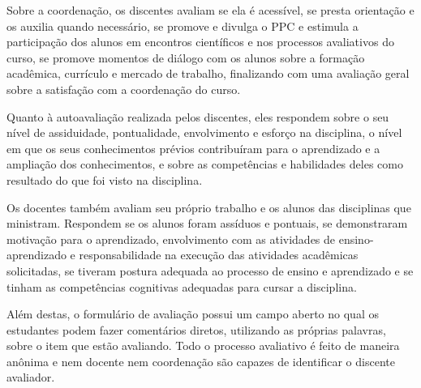 Sobre a coordenação, os discentes avaliam se ela é acessível, se presta orientação e os auxilia quando necessário, se promove e divulga o PPC e estimula a participação dos alunos em encontros científicos e nos processos avaliativos do curso, se promove momentos de diálogo com os alunos sobre a formação acadêmica, currículo e mercado de trabalho, finalizando com uma avaliação geral sobre a satisfação com a coordenação do curso.

Quanto à autoavaliação realizada pelos discentes, eles respondem sobre o seu nível de assiduidade, pontualidade, envolvimento e esforço na disciplina, o nível em que os seus conhecimentos prévios contribuíram para o aprendizado e a ampliação dos conhecimentos, e sobre as competências e habilidades deles como resultado do que foi visto na disciplina.

Os docentes também avaliam seu próprio trabalho e os alunos das disciplinas que ministram. Respondem se os alunos foram assíduos e pontuais, se demonstraram motivação para o aprendizado, envolvimento com as atividades de ensino-aprendizado e responsabilidade na execução das atividades acadêmicas solicitadas, se tiveram postura adequada ao processo de ensino e aprendizado e se tinham as competências cognitivas adequadas para cursar a disciplina.

Além destas, o formulário de avaliação possui um campo aberto no qual os estudantes podem fazer comentários diretos, utilizando as próprias palavras, sobre o item que estão avaliando. Todo o processo avaliativo é feito de maneira anônima e nem docente nem coordenação são capazes de identificar o discente avaliador.